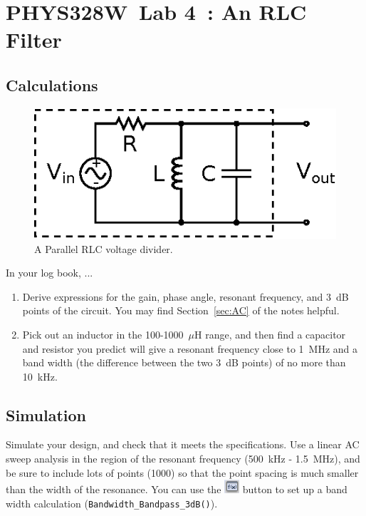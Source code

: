 \documentclass[11pt]{article}
\newcommand{\COURSE}{PHYS328W}
\newcommand{\LABNUM}{4}
\newcommand{\TITLE}{An RLC Filter}
\begin{document}
\thispagestyle{empty}

\section*{\COURSE\ Lab \LABNUM\ : \TITLE}

\subsection*{Calculations}

\begin{figure}[h]
\centering
\includegraphics{rlcparallel.eps}
\caption{A Parallel RLC voltage divider.}
\label{fig:rlcparallel}
\end{figure}

In your log book, ...

\begin{enumerate}
\item Derive expressions for the gain, phase angle, resonant
  frequency, and 3~dB points of the circuit. You may find
  Section~\ref{sec:AC} of the notes helpful.

\item Pick out an inductor in the 100-1000~$\mu$H range, and then find
  a capacitor and resistor you predict will give a resonant frequency
  close to 1~MHz and a band width (the difference between the two 3~dB
  points) of no more than 10~kHz.
\end{enumerate}

\subsection*{Simulation}

Simulate your design, and check that it meets the specifications. Use
a linear AC sweep analysis in the region of the resonant frequency
(500~kHz - 1.5~MHz), and be sure to include lots of points (1000) so
that the point spacing is much smaller than the width of the resonance. 
You can use the \includegraphics{PSpiceAD_DefineMeasurement.png} button to
set up a band width calculation (\verb+Bandwidth_Bandpass_3dB()+).
\end{document}
